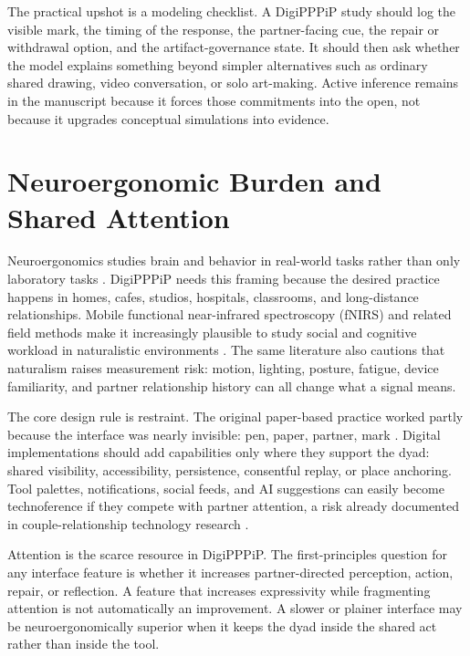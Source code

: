 \documentclass[
  english,
]{article}
\begin{document}
The practical upshot is a modeling checklist. A DigiPPPiP study should
log the visible mark, the timing of the response, the partner-facing
cue, the repair or withdrawal option, and the artifact-governance state.
It should then ask whether the model explains something beyond simpler
alternatives such as ordinary shared drawing, video conversation, or
solo art-making. Active inference remains in the manuscript because it
forces those commitments into the open, not because it upgrades
conceptual simulations into evidence.

\newpage

\section{Neuroergonomic Burden and Shared
Attention}\label{sec:neuroergonomics}

Neuroergonomics studies brain and behavior in real-world tasks rather
than only laboratory tasks \citep{ayaz2019neuroergonomics}. DigiPPPiP
needs this framing because the desired practice happens in homes, cafes,
studios, hospitals, classrooms, and long-distance relationships. Mobile
functional near-infrared spectroscopy (fNIRS) and related field methods
make it increasingly plausible to study social and cognitive workload in
naturalistic environments
\citep{dehais2020grand, moffat2024mobilefnirs}. The same literature also
cautions that naturalism raises measurement risk: motion, lighting,
posture, fatigue, device familiarity, and partner relationship history
can all change what a signal means.

The core design rule is restraint. The original paper-based practice
worked partly because the interface was nearly invisible: pen, paper,
partner, mark \citep{mikhailova2018pppip}. Digital implementations
should add capabilities only where they support the dyad: shared
visibility, accessibility, persistence, consentful replay, or place
anchoring. Tool palettes, notifications, social feeds, and AI
suggestions can easily become technoference if they compete with partner
attention, a risk already documented in couple-relationship technology
research \citep{mcdaniel2016technoference}.

Attention is the scarce resource in DigiPPPiP. The first-principles
question for any interface feature is whether it increases
partner-directed perception, action, repair, or reflection. A feature
that increases expressivity while fragmenting attention is not
automatically an improvement. A slower or plainer interface may be
neuroergonomically superior when it keeps the dyad inside the shared act
rather than inside the tool.
\end{document}
